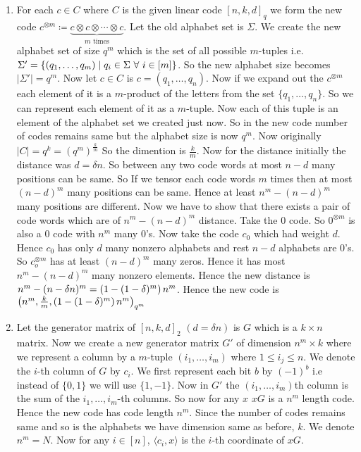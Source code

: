 \documentclass[a4paper, 11pt]{article}
\begin{document}
{\begin{enumerate}[label=(\alph*)]
		\item For each $c\in C$ where $C$ is the given linear code $[n,k,d]_q$ we form the new code $c^{\otimes m}\coloneqq\underbrace{c\otimes c\otimes \cdots\otimes c}_{m\text{ times}}$. Let the old alphabet set is $\Sigma$. We create the new alphabet set of size $q^m$ which is the set of all possible $m$-tuples i.e. $\Sigma' =\left\{ (q_1,\dots,q_m)\mid q_i\in \Sigma\ \forall \ i\in [m] \right\}$. So the new alphabet size becomes $|\Sigma'|=q^m$. 
		Now let $c\in C$ is $c=(q_1,\dots,q_n)$. Now if we expand out the $c^{\otimes m}$ each element of it is a $m$-product of the letters from the set $\{q_1,\dots,q_n\}$. So we can represent each element of it as a $m$-tuple. Now each of this tuple is an element of the alphabet set we created just now. So in the new code number of codes remains same but the alphabet size is now $q^m$. Now originally $|C|=q^k=(q^m)^{\frac{k}{m}}$ So the dimention is $\frac{k}{m}$. Now for the distance initially the distance was $d=\delta n$. So between any two code words at most $n-d$ many positions can be same. So If we tensor each code words $m$ times then at most $(n-d)^m$ many positions can be same. Hence at least $n^m-(n-d)^m$ many positions are different. Now we have to show that there exists a pair of code words which are of $n^m-(n-d)^m$ distance. Take the $0$ code. So $0^{\otimes m}$ is also a $0$ code with $n^m$ many 0's. Now take the code $c_0$ which had weight $d$. Hence $c_0$ has only $d$ many nonzero alphabets and rest $n-d$ alphabets are 0's. So $c_o^{\otimes m}$ has at least $(n-d)^m$ many zeros. Hence it has most $n^m-(n-d)^m$ many nonzero elements. Hence the new distance is $n^m-(n-\delta n)^m=\left(1-(1-\delta)^m\right)n^m$. Hence the new code is $\left( n^m,\frac{k}{m},\left(1-(1-\delta)^m\right)n^m \right)_{q^m}$
		\item Let the generator matrix of $[n,k,d]_2$ $(d=\delta n)$ is $G$ which is a $k\times n$ matrix. Now we create a new generator matrix $G'$ of dimension $n^m\times k$ where we represent a column by a $m$-tuple $(i_1,\dots,i_m)$ where $1\leq i_j\leq n$. We denote the $i$-th column of $G$ by $c_i$. We first represent each bit $b$ by $(-1)^b$ i.e instead of $\{0,1\}$ we will use $\{1,-1\}$. Now in $G'$ the $(i_1,\dots,i_m)$th column is the sum of the $i_1,\dots,i_m$-th columns. So now for any $x$ $xG$ is a $n^m$ length code. Hence the new code has code length $n^m$. Since the number of codes remains same and so is the alphabets we have dimension same as before, $k$. We denote $n^m=N$. Now for any $i\in [n]$, $\langle c_i,x\rangle$ is the $i$-th coordinate of $xG$.  \parinn
		

\end{enumerate}}
\end{document}
